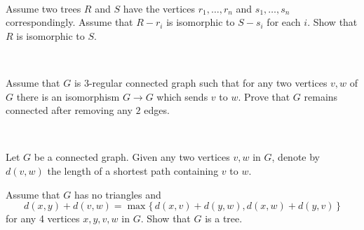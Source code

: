 \documentclass[oneside,a4paper]{article}
\begin{document}
\ 

Assume two trees $R$ and $S$ 
have the vertices $r_1,\dots,r_n$ and $s_1,\dots,s_n$ correspondingly.
Assume that $R-r_i$ is isomorphic to $S-s_i$ for each $i$.
Show that $R$ is isomorphic to $S$.

\ 

Assume that $G$ is $3$-regular connected graph such that 
for any two vertices $v,w$ of $G$ there is an isomorphism
$G\to G$ which sends $v$ to $w$.
Prove that $G$ remains connected after removing any $2$ edges.

\ 

Let $G$ be a connected graph.
Given any two vertices $v,w$ in $G$, denote by $d(v,w)$ the length of a shortest path containing $v$ to $w$. 

Assume that $G$ has no triangles and
\[d(x,y)+d(v,w)=\max\{\,d(x,v)+d(y,w),d(x,w)+d(y,v)\,\}\]
for any 4 vertices $x,y,v,w$ in $G$.
Show that $G$ is a tree.
\end{document}

